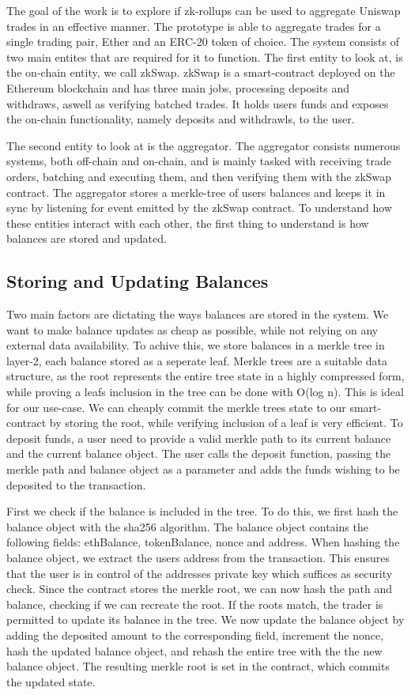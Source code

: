 \documentclass[../../thesis.tex]{subfiles}
\begin{document}
The goal of the work is to explore if zk-rollups can be used to aggregate Uniswap trades in an effective manner. The prototype is able to aggregate trades for a single trading pair, Ether and an ERC-20 token of choice. The system consists of two main entites that are required for it to function. The first entity to look at, is the on-chain entity, we call zkSwap. zkSwap is a smart-contract deployed on the Ethereum blockchain and has three main jobs, processing deposits and withdraws, aswell as verifying batched trades. It holds users funds and exposes the on-chain functionality, namely deposits and withdrawls, to the user. 

The second entity to look at is the aggregator. The aggregator consists numerous systems, both off-chain and on-chain, and is mainly tasked with receiving trade orders, batching and executing them, and then verifying them with the zkSwap contract. The aggregator stores a merkle-tree of users balances and keeps it in sync by listening for event emitted by the zkSwap contract. To understand how these entities interact with each other, the first thing to understand is how balances are stored and updated. 

\subsection{Storing and Updating Balances}
Two main factors are dictating the ways balances are stored in the system. We want to make balance updates as cheap as possible, while not relying on any external data availability. To achive this, we store balances in a merkle tree in layer-2, each balance stored as a seperate leaf. Merkle trees are a suitable data structure, as the root represents the entire tree state in a highly compressed form, while proving a leafs inclusion in the tree can be done with O(log n). This is ideal for our use-case. We can cheaply commit the merkle trees state to our smart-contract by storing the root, while verifying inclusion of a leaf is very efficient. 
To deposit funds, a user need to provide a valid merkle path to its current balance and the current balance object. The user calls the deposit function, passing the merkle path and balance object as a parameter and adds the funds wishing to be deposited to the transaction. 

First we check if the balance is included in the tree. To do this, we first hash the balance object with the sha256 algorithm. The balance object contains the following fields: ethBalance, tokenBalance, nonce and address. When hashing the balance object, we extract the users address from the transaction. This ensures that the user is in control of the addresses private key which suffices as security check. Since the contract stores the merkle root, we can now hash the path and balance, checking if we can recreate the root. If the roots match, the trader is permitted to update its balance in the tree. We now update the balance object by adding the deposited amount to the corresponding field, increment the nonce, hash the updated balance object, and rehash the entire tree with the the new balance object. The resulting merkle root is set in the contract, which commits the updated state. 
\end{document}
